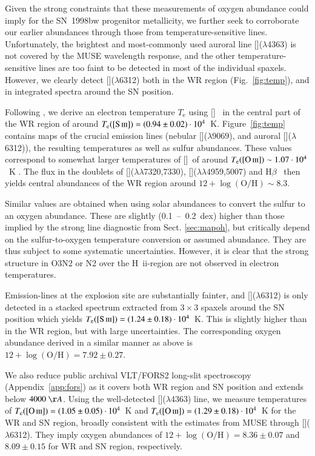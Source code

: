 \documentclass[traditabstract, referee]{aa}
\newcommand{\hb}{H$\beta$}
\newcommand{\hii}{\mbox{H~{\sc ii}}}
\newcommand{\oh}{12+\log(\mathrm{O/H})}
\newcommand{\siii}{[\ion{S}{iii}]}
\newcommand{\oii}{[\ion{O}{ii}]}
\newcommand{\oiii}{[\ion{O}{iii}]}
\begin{document}
Given the strong constraints that these measurements of oxygen abundance could imply for the SN~1998bw progenitor metallicity, we further seek to corroborate our earlier abundances through those from temperature-sensitive lines. Unfortunately, the brightest and most-commonly used auroral line \oiii($\lambda$4363) is not covered by the MUSE wavelength response, and the other temperature-sensitive lines are too faint to be detected in most of the individual spaxels. However, we clearly detect \siii($\lambda$6312) both in the WR region (Fig.~\ref{fig:temp}), and in integrated spectra around the SN position.

Following \citet{2013ApJS..207...21N}, we derive an electron temperature $T_\mathrm{e}$ using \siii~ in the central part of the WR region of around $T_{\mathrm{e}}({\siii})=(0.94\pm0.02)\cdot10^{4}$~K. Figure~\ref{fig:temp} contains maps of the crucial emission lines (nebular \siii($\lambda9069$), and auroral \siii($\lambda$6312)), the resulting temperatures as well as sulfur abundances. These values correspond to somewhat larger temperatures of \oiii~of around $T_{\mathrm{e}}(\oiii) \sim 1.07\cdot10^{4}$~K \citep{2006A&A...448..955I, 2012A&A...547A..29B}. The flux in the doublets of \oii($\lambda\lambda$7320,7330), \oiii($\lambda\lambda$4959,5007) and \hb~ then yields central abundances of the WR region around $\oh \sim 8.3$.

Similar values are obtained when using solar abundances to convert the sulfur to an oxygen abundance. These are slightly (0.1~--~0.2~dex) higher than those implied by the strong line diagnostic from Sect. \ref{sec:mapoh}, but critically depend on the sulfur-to-oxygen temperature conversion or assumed abundance. They are thus subject to some systematic uncertainties. However, it is clear that the strong structure in O3N2 or N2 over the \hii-region are not observed in electron temperatures.

Emission-lines at the explosion site are substantially fainter, and \siii($\lambda$6312) is only detected in a stacked spectrum extracted from $3\times3$ spaxels around the SN position which yields $T_{\mathrm{e}}(\siii)=(1.24\pm0.18)\cdot10^{4}$~K. This is slightly higher than in the WR region, but with large uncertainties. The corresponding oxygen abundance derived in a similar manner as above is $\oh=7.92\pm0.27$.

We also reduce public archival VLT/FORS2 long-slit spectroscopy (Appendix~\ref{app:fors}) as it covers both WR region and SN position and extends below $4000~\AA$. Using the well-detected \oiii($\lambda$4363) line, we measure temperatures of $T_{\mathrm{e}}(\oiii)=(1.05\pm0.05)\cdot 10^{4}$~K and $T_{\mathrm{e}}(\oiii)=(1.29\pm0.18)\cdot10^{4}$~K for the WR and SN region, broadly consistent with the estimates from MUSE through \siii($\lambda$6312). They imply oxygen abundances of $\oh=8.36\pm0.07$ and $8.09\pm0.15$ for WR and SN region, respectively.
\end{document}
